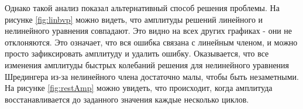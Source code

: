 \documentclass[A4,12pt,oneside]{article}
\renewcommand{\(}{\left(}
\renewcommand{\)}{\right)}
\begin{document}
Однако такой анализ показал альтернативный способ решения проблемы. На рисунке \ref{fig:linbvp} можно видеть, что амплитуды решений линейного и нелинейного уравнения совпадают. Это видно на всех других графиках - они не отклоняются. Это означает, что вся ошибка связана с линейным членом, и можно просто зафиксировать амплитуду и удалить ошибку. Оказывается, что все изменения амплитуды быстрых колебаний решения для нелинейного уравнения Шредингера из-за нелинейного члена достаточно малы, чтобы быть незаметными. На рисунке \ref{fig:restAmp} можно увидеть, что происходит, когда амплитуда восстанавливается до заданного значения каждые несколько циклов.
\vspace{-1cm}
\end{document}
